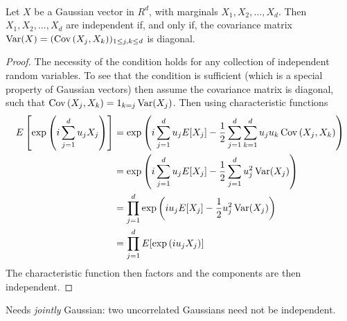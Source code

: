 \begin{proposition} \label{chap1.2:proposition-independence_iff_uncorrelated_gaussian_vectors}
 \\
Let $X$ be a Gaussian vector in $R^d$, with marginals $X_1, X_2,...,X_d$. Then $X_1, X_2,...,X_d$ are independent if, and only if, the covariance matrix $\operatorname{Var}(X)=(\operatorname{Cov}\left(X_j, X_k\right))_{1 \leq j,k\leq d}$ is diagonal.
\end{proposition}
\begin{proof}
The necessity of the condition holds for any collection of independent random variables. To see that the condition is sufficient (which is a special property of Gaussian vectors) then assume the covariance matrix is diagonal, such that $\operatorname{Cov}\left(X_j, X_k\right)=1_{k=j}\operatorname{Var}(X_j)$. Then using characteristic functions
\begin{align*}
E\left[\exp{\left(i \sum_{j = 1}^du_jX_j \right)} \right]
&=\exp{\left(i \sum_{j = 1}^du_jE[X_j] -\frac{1}{2}\sum_{j=1}^d\sum_{k = 1}^d u_ju_k\operatorname{Cov}\left(X_j, X_k\right)\right)} \\
&= \exp{\left(i \sum_{j = 1}^du_jE[X_j] -\frac{1}{2}\sum_{j=1}^du_j^2\operatorname{Var}(X_j)\right)}\\
&=\prod_{j=1}^d\exp{\left(i u_jE[X_j] -\frac{1}{2}u_j^2\operatorname{Var}(X_j)\right)}\\
&=\prod_{j=1}^d E[\exp{\left(iu_jX_j \right)}]
\end{align*}
The characteristic function then factors and the components are then independent.
\end{proof}

\begin{trap} Needs \emph{jointly} Gaussian: two uncorrelated Gaussians need not be independent.\end{trap}


